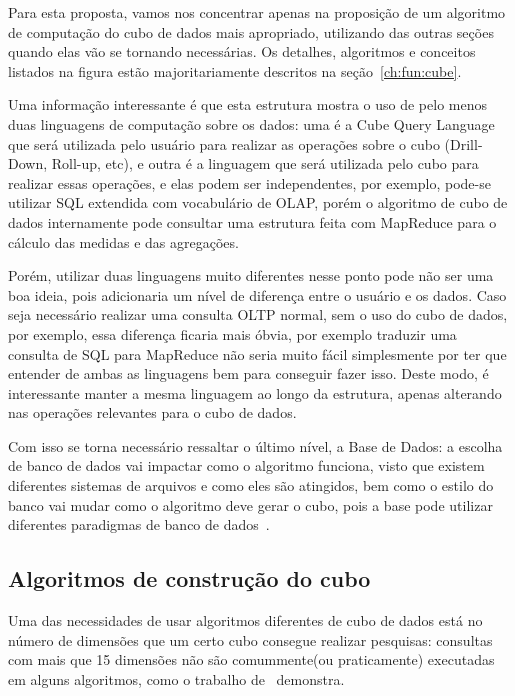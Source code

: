 Para esta proposta, vamos nos concentrar apenas na proposição de um algoritmo de computação do cubo de dados mais apropriado, utilizando das outras seções quando elas vão se tornando necessárias.
Os detalhes, algoritmos e conceitos listados na figura estão majoritariamente descritos na seção~\ref{ch:fun:cube}.

Uma informação interessante é que esta estrutura mostra o uso de pelo menos duas linguagens de computação sobre os dados: uma é a Cube Query Language que será utilizada pelo usuário para realizar as operações sobre o cubo (Drill-Down, Roll-up, etc), e outra é a linguagem que será utilizada pelo cubo para realizar essas operações, e elas podem ser independentes, por exemplo, pode-se utilizar SQL extendida com vocabulário de OLAP, porém o algoritmo de cubo de dados internamente pode consultar uma estrutura feita com MapReduce para o cálculo das medidas e das agregações.

Porém, utilizar duas linguagens muito diferentes nesse ponto pode não ser uma boa ideia, pois adicionaria um nível de diferença entre o usuário e os dados.
Caso seja necessário realizar uma consulta OLTP normal, sem o uso do cubo de dados, por exemplo, essa diferença ficaria mais óbvia, por exemplo traduzir uma consulta de SQL para MapReduce não seria muito fácil simplesmente por ter que entender de ambas as linguagens bem para conseguir fazer isso.
Deste modo, é interessante manter a mesma linguagem ao longo da estrutura, apenas alterando nas operações relevantes para o cubo de dados.

Com isso se torna necessário ressaltar o último nível, a Base de Dados: a escolha de banco de dados vai impactar como o algoritmo funciona, visto que existem diferentes sistemas de arquivos e como eles são atingidos, bem como o estilo do banco vai mudar como o algoritmo deve gerar o cubo, pois a base pode utilizar diferentes paradigmas de banco de dados~\cite{cuzzocreaDataWarehousingOLAP2013}.

\subsection{Algoritmos de construção do cubo}\label{ch:prop:cubearch:algo}

Uma das necessidades de usar algoritmos diferentes de cubo de dados está no número de dimensões que um certo cubo consegue realizar pesquisas: consultas com mais que 15 dimensões não são comummente(ou praticamente) executadas em alguns algoritmos, como o trabalho de~\cite{silva:2015:abordagensParaCubo} demonstra.

